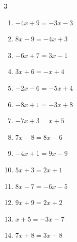 \begin{multicols}{3}
\begin{enumerate}

  \item $-4x+9=-3x-3$

        \phantom{$\displaystyle x=12$}

  \item $8x-9=-4x+3$

        \phantom{$\displaystyle x=1$}

  \item $-6x+7=3x-1$


  \item $3x+6=-x+4$


  \item $-2x-6=-5x+4$


  \item $-8x+1=-3x+8$


  \item $-7x+3=x+5$


  \item $7x-8=8x-6$

        \phantom{$\displaystyle x=-2$}

  \item $-4x+1=9x-9$


  \item $5x+3=2x+1$


  \item $8x-7=-6x-5$


\columnbreak %

  \item $9x+9=2x+2$

        \phantom{$\displaystyle x=-1$}

  \item $x+5=-3x-7$

        \phantom{$\displaystyle x=-3$}

  \item $7x+8=3x-8$


\end{enumerate}
\end{multicols}
